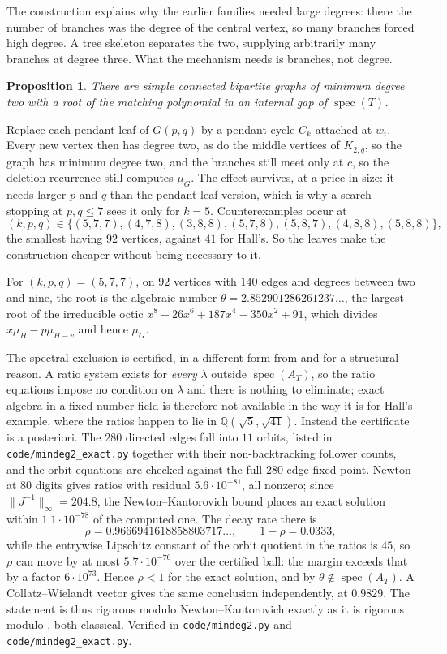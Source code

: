 \documentclass[11pt]{article}
\newtheorem{proposition}[theorem]{Proposition}
\theoremstyle{remark}
\begin{document}
The construction explains why the earlier families needed large degrees: there the number of
branches was the degree of the central vertex, so many branches forced high degree. A tree
skeleton separates the two, supplying arbitrarily many branches at degree three. What the
mechanism needs is branches, not degree.

\begin{proposition}\label{prop:mindeg2}
There are simple connected bipartite graphs of minimum degree two with a root of the matching
polynomial in an internal gap of $\operatorname{spec}(T)$.
\end{proposition}

Replace each pendant leaf of $G(p,q)$ by a pendant cycle $C_k$ attached at $w_i$. Every new
vertex then has degree two, as do the middle vertices of $K_{2,q}$, so the graph has minimum
degree two, and the branches still meet only at $c$, so the deletion recurrence still
computes $\mu_G$. The effect survives, at a price in size: it needs larger $p$ and $q$ than
the pendant-leaf version, which is why a search stopping at $p,q\le7$ sees it only for
$k=5$. Counterexamples occur at
\[
   (k,p,q)\in\{(5,7,7),(4,7,8),(3,8,8),(5,7,8),(5,8,7),(4,8,8),(5,8,8)\},
\]
the smallest having $92$ vertices, against $41$ for Hall's. So the leaves make the
construction cheaper without being necessary to it.

For $(k,p,q)=(5,7,7)$, on $92$ vertices with $140$ edges and degrees between two and nine,
the root is the algebraic number $\theta=2.852901286261237\ldots$, the largest root of the
irreducible octic $x^8-26x^6+187x^4-350x^2+91$, which divides $x\mu_H-p\mu_{H-v}$ and hence
$\mu_G$.

The spectral exclusion is certified, in a different form from \cite{HallCE} and for a
structural reason. A ratio system exists for \emph{every} $\lambda$ outside
$\operatorname{spec}(A_T)$, so the ratio equations impose no condition on $\lambda$ and there
is nothing to eliminate; exact algebra in a fixed number field is therefore not available in
the way it is for Hall's example, where the ratios happen to lie in
$\mathbb{Q}(\sqrt5,\sqrt{41})$. Instead the certificate is a posteriori. The $280$ directed
edges fall into $11$ orbits, listed in \texttt{code/mindeg2\_exact.py} together with their
non-backtracking follower counts, and the orbit equations are checked against the full
$280$-edge fixed point. Newton at $80$ digits gives ratios with residual
$5.6\cdot10^{-81}$, all nonzero; since $\|J^{-1}\|_\infty=204.8$, the Newton--Kantorovich
bound places an exact solution within $1.1\cdot10^{-78}$ of the computed one. The decay rate
there is
\[
   \rho=0.9666941618858803717\ldots,\qquad 1-\rho=0.0333,
\]
while the entrywise Lipschitz constant of the orbit quotient in the ratios is $45$, so $\rho$
can move by at most $5.7\cdot10^{-76}$ over the certified ball: the margin exceeds that by a
factor $6\cdot10^{73}$. Hence $\rho<1$ for the exact solution, and by \cite{AFH}
$\theta\notin\operatorname{spec}(A_T)$. A Collatz--Wielandt vector gives the same conclusion
independently, at $0.9829$. The statement is thus rigorous modulo Newton--Kantorovich exactly
as it is rigorous modulo \cite{AFH}, both classical. Verified in \texttt{code/mindeg2.py} and
\texttt{code/mindeg2\_exact.py}.
\end{document}
